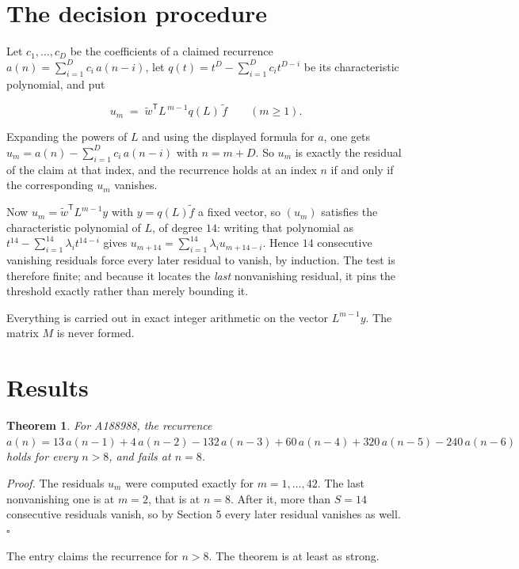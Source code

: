 \documentclass[11pt]{article}
\newtheorem{theorem}{Theorem}
\theoremstyle{definition}
\begin{document}
\section{The decision procedure}

Let $c_1,\dots,c_D$ be the coefficients of a claimed recurrence $a(n) = \sum_{i=1}^{D} c_i\,a(n-i)$, let $q(t) = t^{D} - \sum_{i=1}^{D} c_i t^{D-i}$ be its characteristic polynomial, and put

\[u_m \;=\; \tilde w^{\mathsf T} L^{\,m-1} q(L)\,\tilde f \qquad (m \ge 1).\]

Expanding the powers of $L$ and using the displayed formula for $a$, one gets $u_m = a(n) - \sum_{i=1}^{D} c_i\,a(n-i)$ with $n = m + D$. So $u_m$ is exactly the residual of the claim at that index, and the recurrence holds at an index $n$ if and only if the corresponding $u_m$ vanishes.

Now $u_m = \tilde w^{\mathsf T} L^{m-1} y$ with $y = q(L)\tilde f$ a fixed vector, so $(u_m)$ satisfies the characteristic polynomial of $L$, of degree $14$: writing that polynomial as $t^{14} - \sum_{i=1}^{14} \lambda_i t^{14-i}$ gives $u_{m+14} = \sum_{i=1}^{14} \lambda_i u_{m+14-i}$. Hence $14$ consecutive vanishing residuals force every later residual to vanish, by induction. The test is therefore finite; and because it locates the {\itshape last} nonvanishing residual, it pins the threshold exactly rather than merely bounding it.

Everything is carried out in exact integer arithmetic on the vector $L^{m-1}y$. The matrix $M$ is never formed.

\section{Results}

\begin{theorem} For A188988, the recurrence $a(n) = 13\,a(n-1) + 4\,a(n-2) - 132\,a(n-3) + 60\,a(n-4) + 320\,a(n-5) - 240\,a(n-6)$ holds for every $n > 8$, and fails at $n = 8$.\end{theorem}

{\itshape Proof.} The residuals $u_m$ were computed exactly for $m = 1,\dots,42$. The last nonvanishing one is at $m = 2$, that is at $n = 8$. After it, more than $S = 14$ consecutive residuals vanish, so by Section 5 every later residual vanishes as well. $\square$

The entry claims the recurrence for $n > 8$. The theorem is at least as strong.
\end{document}
